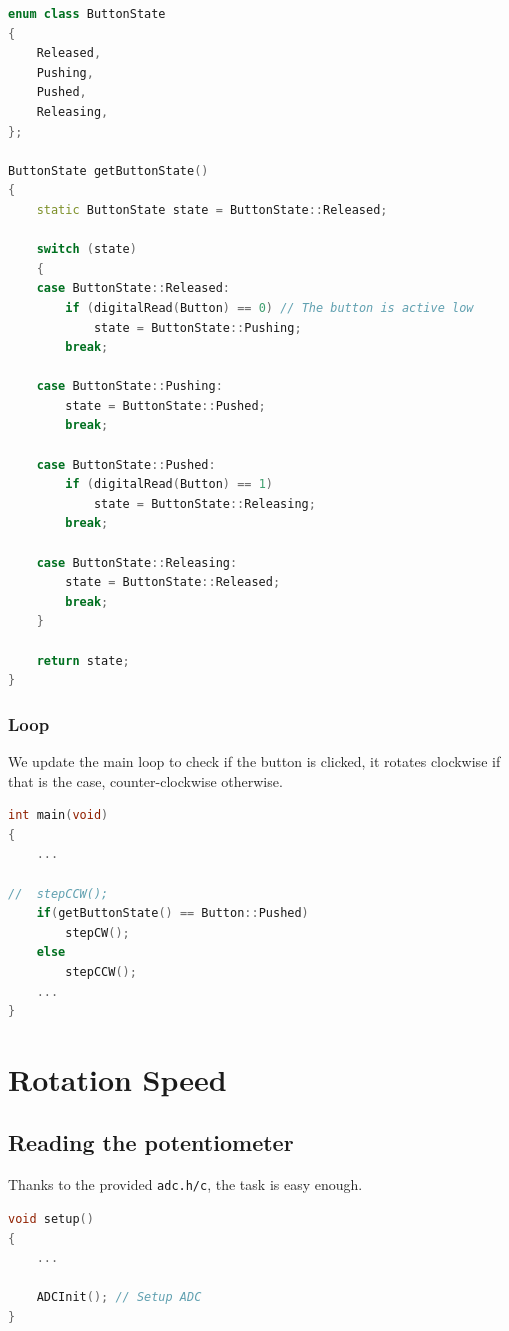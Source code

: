 \documentclass{article}
\begin{document}
\begin{lstlisting}[language=C++, caption={Button state}]
enum class ButtonState
{
    Released,
    Pushing,
    Pushed,
    Releasing,
};

ButtonState getButtonState()
{
    static ButtonState state = ButtonState::Released;

    switch (state)
    {
    case ButtonState::Released:
        if (digitalRead(Button) == 0) // The button is active low
            state = ButtonState::Pushing;
        break;

    case ButtonState::Pushing:
        state = ButtonState::Pushed;
        break;

    case ButtonState::Pushed:
        if (digitalRead(Button) == 1)
            state = ButtonState::Releasing;
        break;

    case ButtonState::Releasing:
        state = ButtonState::Released;
        break;
    }

    return state;
}
\end{lstlisting}

\subsubsection{Loop}

We update the main loop to check if the button is clicked, it rotates clockwise if that is the case, counter-clockwise otherwise.

\begin{lstlisting}[language=C++, caption={Rotation direction based on button state}]
int main(void)
{
    ...
    
//  stepCCW();
    if(getButtonState() == Button::Pushed)
        stepCW();
    else
        stepCCW();
    ...
}
\end{lstlisting}

\section{Rotation Speed}

\subsection{Reading the potentiometer}

Thanks to the provided \verb|adc.h/c|, the task is easy enough.

\begin{lstlisting}[language=C++]
void setup()
{
    ...
    
    ADCInit(); // Setup ADC
}
\end{lstlisting}
\end{document}
